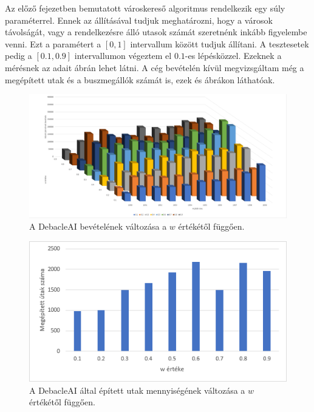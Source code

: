 
Az előző fejezetben bemutatott városkereső algoritmus rendelkezik egy súly paraméterrel. Ennek az állításával tudjuk meghatározni, hogy a városok távolságát, vagy a rendelkezésre álló utasok számát szeretnénk inkább figyelembe venni.  Ezt a paramétert a $[0,1]$ intervallum között tudjuk állítani. A tesztesetek pedig a $[0.1,0.9]$ intervallumon végeztem el $0.1$-es lépésközzel. Ezeknek a mérésnek az adait  ábrán lehet látni. A cég bevételén kívül megvizsgáltam még a megépített utak és a buszmegállók számát is, ezek  és  ábrákon láthatóak.

\begin{figure}
	\centering
	\includegraphics[scale=0.35]{images/wmeresek.png}
	\caption{A DebacleAI bevételének változása a $w$ értékétől függően.}
	\label{fig:meresek}
\end{figure}

\begin{figure}
	\centering
	\includegraphics[scale=1]{images/wutak.png}
	\caption{A DebacleAI által épített utak mennyiségének változása a $w$ értékétől függően.}
	\label{fig:utak}
\end{figure}

